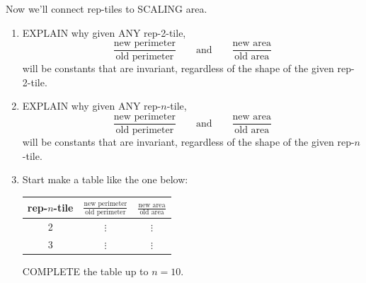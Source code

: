 \documentclass[handout,nooutcomes,noauthor]{ximera}
\begin{document}
\begin{question}
  Now we'll connect rep-tiles to SCALING area.
  \begin{enumerate}
    \item EXPLAIN why given ANY rep-2-tile,
      \[
      \frac{\text{new perimeter}}{\text{old perimeter}}\qquad\text{and}\qquad \frac{\text{new area}}{\text{old area}}
      \]
      will be constants that are invariant, regardless of the shape of
      the given rep-2-tile.
    \item EXPLAIN why given ANY rep-$n$-tile,
      \[
      \frac{\text{new perimeter}}{\text{old perimeter}}\qquad\text{and}\qquad \frac{\text{new area}}{\text{old area}}
      \]
      will be constants that are invariant, regardless of the shape of
      the given rep-$n$-tile.
    \item
      Start make a table like the one below:
      \begin{center}
        \begin{tabular}{c|c|c}
          rep-$n$-tile & $\frac{\text{new perimeter}}{\text{old perimeter}}$ & $\frac{\text{new area}}{\text{old area}}$  \\
          \hline\hline
          2 & $\vdots$  &  $\vdots$  \\ 
          3 & $\vdots$  &  $\vdots$  \\ 
        \end{tabular}
      \end{center}
      COMPLETE the table up to $n= 10$.
  \end{enumerate}
\end{question}
\end{document}
